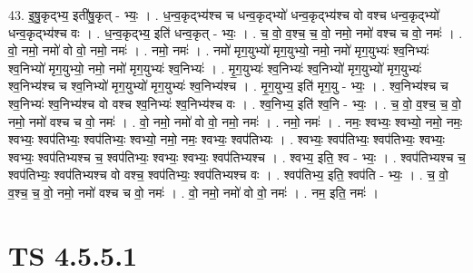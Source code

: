 \documentclass[17pt]{extarticle}
\begin{document}
43. इ॒षु॒कृद्भ्य॒ इती॑षु॒कृत् - भ्यः॒ । . ध॒न्व॒कृद्भ्य॑श्च च धन्व॒कृद्भ्यो॑ धन्व॒कृद्भ्य॑श्च वो वश्च धन्व॒कृद्भ्यो॑ धन्व॒कृद्भ्य॑श्च वः । . ध॒न्व॒कृद्भ्य॒ इति॑ धन्व॒कृत् - भ्यः॒ । . च॒ वो॒ व॒श्च॒ च॒ वो॒ नमो॒ नमो॑ वश्च च वो॒ नमः॑ । . वो॒ नमो॒ नमो॑ वो वो॒ नमो॒ नमः॑ । . नमो॒ नमः॑ । . नमो॑ मृग॒युभ्यो॑ मृग॒युभ्यो॒ नमो॒ नमो॑ मृग॒युभ्यः॑ श्व॒निभ्यः॑ श्व॒निभ्यो॑ मृग॒युभ्यो॒ नमो॒ नमो॑ मृग॒युभ्यः॑ श्व॒निभ्यः॑ । . मृ॒ग॒युभ्यः॑ श्व॒निभ्यः॑ श्व॒निभ्यो॑ मृग॒युभ्यो॑ मृग॒युभ्यः॑ श्व॒निभ्य॑श्च च श्व॒निभ्यो॑ मृग॒युभ्यो॑ मृग॒युभ्यः॑ श्व॒निभ्य॑श्च । . मृ॒ग॒युभ्य॒ इति॑ मृग॒यु - भ्यः॒ । . श्व॒निभ्य॑श्च च श्व॒निभ्यः॑ श्व॒निभ्य॑श्च वो वश्च श्व॒निभ्यः॑ श्व॒निभ्य॑श्च वः । . श्व॒निभ्य॒ इति॑ श्व॒नि - भ्यः॒ । . च॒ वो॒ व॒श्च॒ च॒ वो॒ नमो॒ नमो॑ वश्च च वो॒ नमः॑ । . वो॒ नमो॒ नमो॑ वो वो॒ नमो॒ नमः॑ । . नमो॒ नमः॑ । . नमः॒ श्वभ्यः॒ श्वभ्यो॒ नमो॒ नमः॒ श्वभ्यः॒ श्वप॑तिभ्यः॒ श्वप॑तिभ्यः॒ श्वभ्यो॒ नमो॒ नमः॒ श्वभ्यः॒ श्वप॑तिभ्यः । . श्वभ्यः॒ श्वप॑तिभ्यः॒ श्वप॑तिभ्यः॒ श्वभ्यः॒ श्वभ्यः॒ श्वप॑तिभ्यश्च च॒ श्वप॑तिभ्यः॒ श्वभ्यः॒ श्वभ्यः॒ श्वप॑तिभ्यश्च । . श्वभ्य॒ इति॒ श्व - भ्यः॒ । . श्वप॑तिभ्यश्च च॒ श्वप॑तिभ्यः॒ श्वप॑तिभ्यश्च वो वश्च॒ श्वप॑तिभ्यः॒ श्वप॑तिभ्यश्च वः । . श्वप॑तिभ्य॒ इति॒ श्वप॑ति - भ्यः॒ । . च॒ वो॒ व॒श्च॒ च॒ वो॒ नमो॒ नमो॑ वश्च च वो॒ नमः॑ । . वो॒ नमो॒ नमो॑ वो वो॒ नमः॑ । . नम॒ इति॒ नमः॑ । \newline
\pagebreak
{}

\section{ TS 4.5.5.1 }
\end{document}
